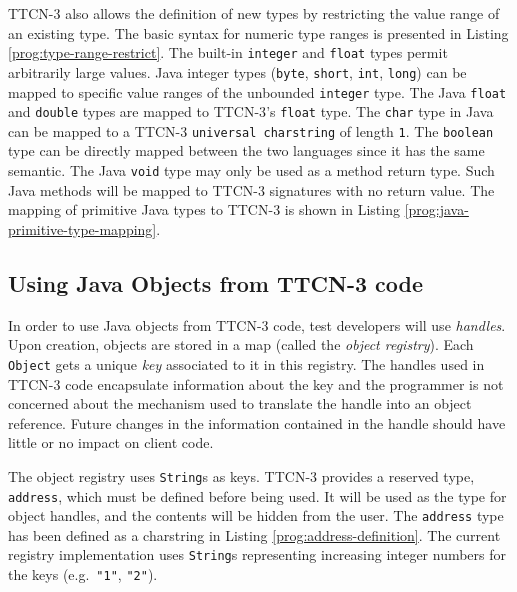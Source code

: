 \ac{TTCN-3} also allows the definition of new types
by restricting the value range of an existing type.
The basic syntax for numeric type ranges is presented in
Listing \ref{prog:type-range-restrict}.
The built-in \verb=integer= and \verb=float= types
permit arbitrarily large values.
Java integer types (\verb=byte=, \verb=short=, \verb=int=, \verb=long=)
can be mapped to specific value ranges of the unbounded \verb=integer= type.
The Java \verb=float= and \verb=double= types are mapped to
\ac{TTCN-3}'s \verb=float= type.
The \verb=char= type in Java can be mapped to a
\ac{TTCN-3} \texttt{universal charstring} of length \verb=1=.
The \verb=boolean= type can be directly mapped between the two languages
since it has the same semantic.
The Java \verb=void= type may only be used as a method return type.
Such Java methods will be mapped to
\ac{TTCN-3} signatures with no return value.
The mapping of primitive Java types to \ac{TTCN-3} is shown in
Listing \ref{prog:java-primitive-type-mapping}.

\begin{program}
\caption{New type definition by restricting the value range %
	of an existing type\label{prog:type-range-restrict}}
\end{program}

\begin{program}
\caption{Mapping of primitive Java types to TTCN-3%
	\label{prog:java-primitive-type-mapping}}
\end{program}


\subsection{Using Java Objects from TTCN-3 code}
\label{sec:using-java-objects-from-ttcn3}

In order to use Java objects from \ac{TTCN-3} code,
test developers will use \emph{handles}.
Upon creation, objects are stored in a map (called the \emph{object registry}).
Each \verb=Object= gets a unique \emph{key} associated to it in this registry.
The handles used in \ac{TTCN-3} code encapsulate information about the key
and the programmer is not concerned
about the mechanism used to translate the handle into an object reference.
Future changes in the information contained in the handle
should have little or no impact on client code.

The object registry uses \verb=String=s as keys.
\ac{TTCN-3} provides a reserved type, \verb=address=,
which must be defined before being used.
It will be used as the type for object handles,
and the contents will be hidden from the user.
The \verb=address= type has been defined as a charstring
in Listing \ref{prog:address-definition}.
The current registry implementation uses \verb=String=s
representing increasing integer numbers for the keys
(e.g.\ \verb="1"=, \verb="2"=).

